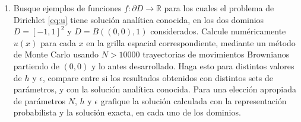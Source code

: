 \begin{enumerate}
\item Busque ejemplos de funciones  $f:\partial D \to \mathbb{R}$ para los cuales el problema de Dirichlet  \eqref{eq:u} tiene soluci\'on anal\'itica conocida, en los dos dominios $D=[-1,1]^2$ y $D=B((0,0), 1)$ considerados.  Calcule num\'ericamente $u(x)$ para cada $x$ en la grilla espacial correspondiente, mediante un m\'etodo de Monte Carlo  usando $N>10000$ trayectorias de movimientos Brownianos partiendo de $(0,0)$ y lo antes desarrollado.  Haga esto para distintos valores de $h$ y $\epsilon$, compare  entre si los resultados obtenidos con distintos sets de par\'ametros, y con la  solución anal\'itica conocida.  Para una elecci\'on apropiada de par\'ametros $N$, $h$ y $\epsilon$  grafique la soluci\'on calculada con la representaci\'on probabilista y la soluci\'on exacta, en cada uno de los dominios. 
\end{enumerate}